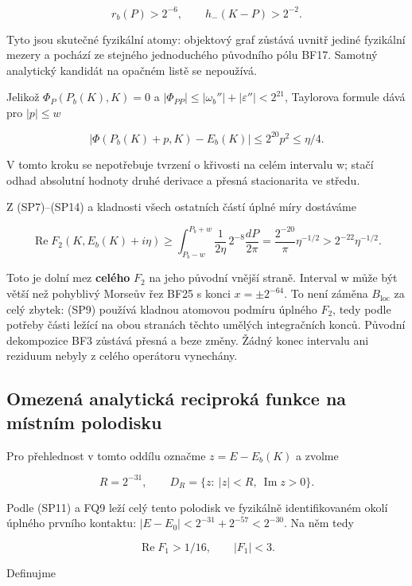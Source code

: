 \documentclass[11pt,a4paper]{article}
\theoremstyle{remark}\newtheorem{remark}[theorem]{Poznámka}
\numberwithin{equation}{section}
\begin{document}
\[
\boxed{r_b(P)>2^{-6},\qquad h_-(K-P)>2^{-2}.}
\tag{SP13}
\]

Tyto jsou skutečné fyzikální atomy: objektový graf zůstává uvnitř jediné
fyzikální mezery a pochází ze stejného jednoduchého původního pólu BF17.
Samotný analytický kandidát na opačném listě se nepoužívá.

Jelikož \(\Phi_P(P_b(K),K)=0\) a
\(|\Phi_{PP}|\le|\omega_b''|+|\varepsilon''|<2^{21}\), Taylorova formule
dává pro \(|p|\le w\)

\[
|\Phi(P_b(K)+p,K)-E_b(K)|
\le2^{20}p^2\le\eta/4.
\tag{SP14}
\]

V tomto kroku se nepotřebuje tvrzení o křivosti na celém intervalu w;
stačí odhad absolutní hodnoty druhé derivace a přesná stacionarita ve
středu.

Z (SP7)--(SP14) a kladnosti všech ostatních částí úplné míry dostáváme

\[
\operatorname{Re}F_2(K,E_b(K)+i\eta)
\ge\int_{P_b-w}^{P_b+w}
\frac{1}{2\eta}\,2^{-8}\frac{dP}{2\pi}
=\frac{2^{-20}}{\pi}\eta^{-1/2}
>2^{-22}\eta^{-1/2}.
\tag{SP15}
\]

Toto je dolní mez \textbf{celého} \(F_2\) na jeho původní vnější straně.
Interval w může být větší než pohyblivý Morseův řez BF25 s konci
\(x=\pm2^{-64}\). To není záměna \(B_{\mathrm{loc}}\) za celý zbytek:
(SP9) používá kladnou atomovou podmíru úplného \(F_2\), tedy podle
potřeby části ležící na obou stranách těchto umělých integračních konců.
Původní dekompozice BF3 zůstává přesná a beze změny. Žádný konec
intervalu ani reziduum nebyly z celého operátoru vynechány.

\hypertarget{omezenuxe1-analytickuxe1-reciprokuxe1-funkce-na-muxedstnuxedm-polodisku}{%
\subsection{Omezená analytická reciproká funkce na místním
polodisku}\label{omezenuxe1-analytickuxe1-reciprokuxe1-funkce-na-muxedstnuxedm-polodisku}}

Pro přehlednost v tomto oddílu označme \(z=E-E_b(K)\) a zvolme

\[
R=2^{-31},\qquad D_R=\{z:\ |z|<R,\ \operatorname{Im}z>0\}.
\tag{SP16}
\]

Podle (SP11) a FQ9 leží celý tento polodisk ve fyzikálně identifikovaném
okolí úplného prvního kontaktu: \(|E-E_0|<2^{-31}+2^{-57}<2^{-30}\). Na
něm tedy

\[
\operatorname{Re}F_1>1/16,\qquad |F_1|<3.
\]

Definujme
\end{document}

